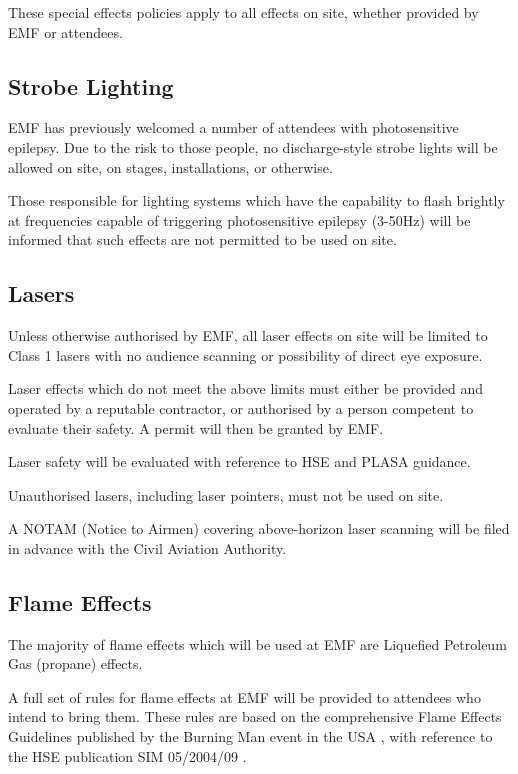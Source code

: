 These special effects policies apply to all effects on site, whether provided
by EMF or attendees.

\subsection{Strobe Lighting}
EMF has previously welcomed a number of attendees with photosensitive epilepsy.
Due to the risk to those people, no discharge-style strobe lights will be allowed
on site, on stages, installations, or otherwise.

Those responsible for lighting systems which have the capability to flash brightly
at frequencies capable of triggering photosensitive epilepsy (3-50Hz) will be
informed that such effects are not permitted to be used on site.

\subsection{Lasers}\label{lasers}
Unless otherwise authorised by EMF, all laser effects on site will be limited to
Class 1 lasers with no audience scanning or possibility of direct eye exposure.

Laser effects which do not meet the above limits must either be provided and
operated by a reputable contractor, or authorised by a person competent to
evaluate their safety. A permit will then be granted by EMF.

Laser safety will be evaluated with reference to HSE \cite{hselaser} and
PLASA \cite{plasalaser} guidance.

Unauthorised lasers, including laser pointers, must not be used on site.

A NOTAM (Notice to Airmen) covering above-horizon laser scanning will be filed
in advance with the Civil Aviation Authority.

\subsection{Flame Effects}\label{flameeffects}
The majority of flame effects which will be used at EMF are Liquefied Petroleum
Gas (propane) effects.

A full set of rules for flame effects at EMF will be provided to attendees who
intend to bring them. These rules are based on the comprehensive
Flame Effects Guidelines published by the Burning Man event in the USA \cite{bmflame},
with reference to the HSE publication SIM 05/2004/09 \cite{lpgsim}.

